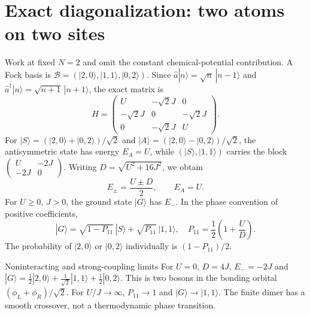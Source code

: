\documentclass[11pt,a4paper]{article}
\begin{document}
\begin{center}\end{center}
\section{Exact diagonalization: two atoms on two sites}
Work at fixed $N=2$ and omit the constant chemical-potential contribution. A Fock basis is $\mathcal B=(|2,0\rangle,|1,1\rangle,|0,2\rangle)$. Since $\hat a|n\rangle=\sqrt n\,|n-1\rangle$ and $\hat a^\dagger|n\rangle=\sqrt{n+1}\,|n+1\rangle$, the exact matrix is
\begin{equation}\boxed{H=\begin{pmatrix}U&-\sqrt2J&0\\-\sqrt2J&0&-\sqrt2J\\0&-\sqrt2J&U\end{pmatrix}.}\end{equation}
For $|S\rangle=(|2,0\rangle+|0,2\rangle)/\sqrt2$ and $|A\rangle=(|2,0\rangle-|0,2\rangle)/\sqrt2$, the antisymmetric state has energy $E_A=U$, while $(|S\rangle,|1,1\rangle)$ carries the block $\left(\begin{smallmatrix}U&-2J\\-2J&0\end{smallmatrix}\right)$. Writing $D=\sqrt{U^2+16J^2}$, we obtain
\begin{equation}\boxed{E_\pm=\frac{U\pm D}{2},\qquad E_A=U.}\end{equation}
For $U\ge0$, $J>0$, the ground state $|G\rangle$ has $E_-$. In the phase convention of positive coefficients,
\begin{equation}
|G\rangle=\sqrt{1-P_{11}}\,|S\rangle+\sqrt{P_{11}}\,|1,1\rangle,\quad
\boxed{P_{11}=\frac12\left(1+\frac{U}{D}\right).}
\end{equation}
The probability of $|2,0\rangle$ or $|0,2\rangle$ individually is $(1-P_{11})/2$.
\begin{worked}{Noninteracting and strong-coupling limits}
For $U=0$, $D=4J$, $E_-=-2J$ and $|G\rangle=\tfrac12|2,0\rangle+\tfrac1{\sqrt2}|1,1\rangle+\tfrac12|0,2\rangle$. This is two bosons in the bonding orbital $(\phi_L+\phi_R)/\sqrt2$. For $U/J\to\infty$, $P_{11}\to1$ and $|G\rangle\to|1,1\rangle$. The finite dimer has a smooth crossover, not a thermodynamic phase transition.
\end{worked}
\end{document}

